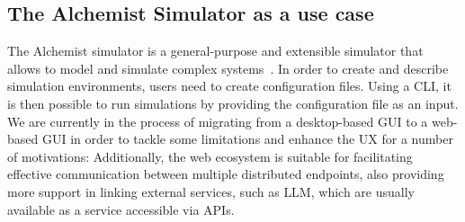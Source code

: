 \documentclass[conference]{IEEEtran}
\begin{document}
\subsection{The Alchemist Simulator as a use case}
The Alchemist simulator is a general-purpose and extensible simulator that allows to model and simulate complex systems~\cite{Pianini_2013}.
%
In order to create and describe simulation environments,
users need to create configuration files.
%
Using a \ac{CLI},
it is then possible to run simulations by providing the configuration file as an input.
%
We are currently in the process of migrating from a desktop-based \ac{GUI} to a web-based \ac{GUI} in order to tackle some limitations and enhance the \ac{UX} for a number of motivations:
%
%
%
%
Additionally,
the web ecosystem is suitable for facilitating effective communication between multiple distributed endpoints,
also providing more support in linking external services,
such as \ac{LLM},
which are usually available as a service accessible via \acp{API}.
%
\end{document}
